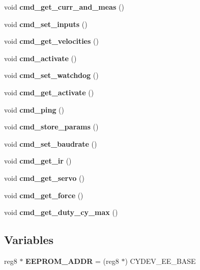 \begin{DoxyCompactItemize}
void {\bfseries cmd\+\_\+get\+\_\+curr\+\_\+and\+\_\+meas} ()
\item 
\mbox{\label{command__processing_8c_a2d8a4542f55af960a27f875b00aad6a1}} 
void {\bfseries cmd\+\_\+set\+\_\+inputs} ()
\item 
\mbox{\label{command__processing_8c_a212883283bd7a8f32846615271cad8ce}} 
void {\bfseries cmd\+\_\+get\+\_\+velocities} ()
\item 
\mbox{\label{command__processing_8c_a107fc9f2982f9a953bdd82aa07279499}} 
void {\bfseries cmd\+\_\+activate} ()
\item 
\mbox{\label{command__processing_8c_aa94cd9c2e2fbfc5b98e84f67569cfe82}} 
void {\bfseries cmd\+\_\+set\+\_\+watchdog} ()
\item 
\mbox{\label{command__processing_8c_a554d563001517bfbc44400a1e999b393}} 
void {\bfseries cmd\+\_\+get\+\_\+activate} ()
\item 
\mbox{\label{command__processing_8c_a704f8c8cb0f4d75f243fc2b79bc34188}} 
void {\bfseries cmd\+\_\+ping} ()
\item 
\mbox{\label{command__processing_8c_a1a2493bfc2f30171d7e7a3bd5aebab14}} 
void {\bfseries cmd\+\_\+store\+\_\+params} ()
\item 
\mbox{\label{command__processing_8c_aa86bf1f2fa69ab5927f7e4e40eb40581}} 
void {\bfseries cmd\+\_\+set\+\_\+baudrate} ()
\item 
\mbox{\label{command__processing_8c_aa8deb0d217c870fb9523ac35b98303ac}} 
void {\bfseries cmd\+\_\+get\+\_\+ir} ()
\item 
\mbox{\label{command__processing_8c_a9fe051a55635782fd7f6caadcc13a2e8}} 
void {\bfseries cmd\+\_\+get\+\_\+servo} ()
\item 
\mbox{\label{command__processing_8c_a6c4d3e3210b0b6495ccac73a03e0cc38}} 
void {\bfseries cmd\+\_\+get\+\_\+force} ()
\item 
\mbox{\label{command__processing_8c_a43fb73e07e991a54dc51896da7795232}} 
void {\bfseries cmd\+\_\+get\+\_\+duty\+\_\+cy\+\_\+max} ()
\end{DoxyCompactItemize}
\subsection*{Variables}
\begin{DoxyCompactItemize}
\item 
\mbox{\label{command__processing_8c_aba5b9353e6d38cc61eb2bd363df61248}} 
reg8 $\ast$ {\bfseries E\+E\+P\+R\+O\+M\+\_\+\+A\+D\+DR} = (reg8 $\ast$) C\+Y\+D\+E\+V\+\_\+\+E\+E\+\_\+\+B\+A\+SE
\end{DoxyCompactItemize}


